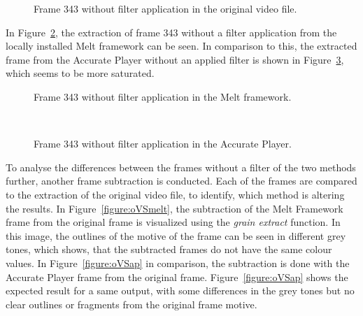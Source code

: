 \documentclass[../MasterThesis.tex]{subfiles}
\begin{document}
\begin{figure}[H]
	\begin{center}
		\caption[Frame 343 without filter application in the original video file.]{Frame 343 without filter application in the original video file.}
		\label{figure:nofilterO}
	\end{center}
\end{figure}


In Figure~\ref{figure:nofilterMelt}, the extraction of frame 343 without a filter application from the locally installed Melt framework can be seen. In comparison to this, the extracted frame from the Accurate Player without an applied filter is shown in Figure~\ref{figure:nofilterAP}, which seems to be more saturated.


\begin{minipage}{0.48\textwidth}
	\begin{figure}[H]
		\begin{center}
			\caption[Frame 343 without filter application in the Melt framework.]{Frame 343 without filter application in the Melt framework.}
			\label{figure:nofilterMelt}
		\end{center}
	\end{figure}
\end{minipage}\begin{minipage}{0.04\textwidth}
	\ 
\end{minipage}\begin{minipage}{0.48\textwidth}
	\begin{figure}[H]
		\begin{center}
			\caption[Frame 343 without filter application in the Accurate Player.]{Frame 343 without filter application in the Accurate Player.}
			\label{figure:nofilterAP}
		\end{center}
	\end{figure}
\end{minipage}

\vspace*{1.5em}
To analyse the differences between the frames without a filter of the two methods further, another frame subtraction is conducted. Each of the frames are compared to the extraction of the original video file, to identify, which method is altering the results.
In Figure~\ref{figure:oVSmelt}, the subtraction of the Melt Framework frame from the original frame is visualized using the \textit{grain extract} function. In this image, the outlines of the motive of the frame can be seen in different grey tones, which shows, that the subtracted frames do not have the same colour values.
In Figure~\ref{figure:oVSap} in comparison, the subtraction is done with the Accurate Player frame from the original frame. Figure~\ref{figure:oVSap} shows the expected result for a same output, with some differences in the grey tones but no clear outlines or fragments from the original frame motive.
\end{document}
